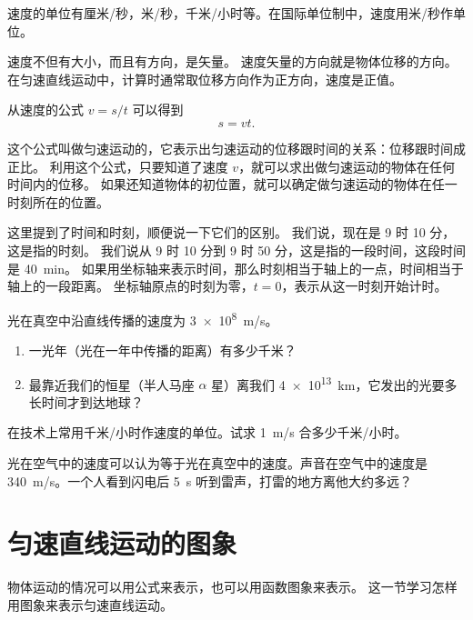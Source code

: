 速度的单位有厘米/秒，米/秒，千米/小时等。在国际单位制中，速度用米/秒作单位。

速度不但有大小，而且有方向，是矢量。
速度矢量的方向就是物体位移的方向。
在匀速直线运动中，计算时通常取位移方向作为正方向，速度是正值。

从速度的公式 $v=s/t$ 可以得到
\[s=vt.\]

这个公式叫做匀速运动的，它表示出匀速运动的位移跟时间的关系：位移跟时间成正比。
利用这个公式，只要知道了速度 $v$，就可以求出做匀速运动的物体在任何时间内的位移。
如果还知道物体的初位置，就可以确定做匀速运动的物体在任一时刻所在的位置。

这里提到了时间和时刻，顺便说一下它们的区别。
我们说，现在是 9 时 10 分，这是指的时刻。
我们说从 9 时 10 分到 9 时 50 分，这是指的一段时间，这段时间是 \qty{40}{min}。
如果用坐标轴来表示时间，那么时刻相当于轴上的一点，时间相当于轴上的一段距离。
坐标轴原点的时刻为零，$t=0$，表示从这一时刻开始计时。

\begin{Practice}
\begin{question}
  \item 光在真空中沿直线传播的速度为 \qty{3e8}{m/s}。
  \begin{enumerate}
    \item 一光年（光在一年中传播的距离）有多少千米？
    \item 最靠近我们的恒星（半人马座 $\alpha$ 星）离我们 \qty{4e13}{km}，它发出的光要多长时间才到达地球？
  \end{enumerate}    
  \item 在技术上常用千米/小时作速度的单位。试求 \qty{1}{m/s} 合多少千米/小时。
  \item 光在空气中的速度可以认为等于光在真空中的速度。声音在空气中的速度是 \qty{340}{m/s}。一个人看到闪电后 \qty{5}{s} 
听到雷声，打雷的地方离他大约多远？
\end{question}
\end{Practice}

\section{匀速直线运动的图象}
物体运动的情况可以用公式来表示，也可以用函数图象来表示。
这一节学习怎样用图象来表示匀速直线运动。

